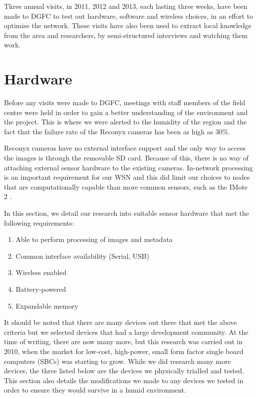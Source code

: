 Three annual visits, in 2011, 2012 and 2013, each lasting three weeks, have been made to DGFC to test out hardware, software and wireless choices, in an effort to optimise the network. These visits have also been used to extract local knowledge from the area and researchers, by semi-structured interviews and watching them work.

\section{Hardware}\label{tech:hw}
	Before any visits were made to DGFC, meetings with staff members of the field centre were held in order to gain a better understanding of the environment and the project. This is where we were alerted to the humidity of the region and the fact that the failure rate of the Reconyx cameras has been as high as 30\%.

Reconyx cameras have no external interface support and the only way to access the images is through the removable SD card. Because of this, there is no way of attaching external sensor hardware to the existing cameras. In-network processing is an important requirement for our WSN and this did limit our choices to nodes that are computationally capable than more common sensors, such as the IMote 2 \cite{Nachman2008}.

In this section, we detail our research into suitable sensor hardware that met the following requirements:
\begin{enumerate}
	\item Able to perform processing of images and metadata
	\item Common interface availability (Serial, USB)
	\item Wireless enabled
	\item Battery-powered
	\item Expandable memory
\end{enumerate}
It should be noted that there are many devices out there that met the above criteria but we selected devices that had a large development community. At the time of writing, there are now many more, but this research was carried out in 2010, when the market for low-cost, high-power, small form factor single board computers (SBCs) was starting to grow. While we did research many more devices, the three listed below are the devices we physically trialled and tested.
This section also details the modifications we made to any devices we tested in order to ensure they would survive in a humid environment.

